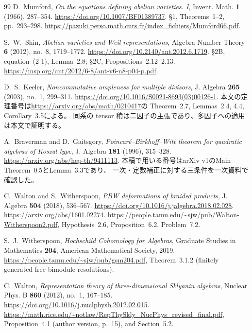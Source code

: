 \begin{thebibliography}{99}
D.~Mumford,
\emph{On the equations defining abelian varieties. I},
Invent. Math. \textbf{1} (1966), 287--354.
\url{https://doi.org/10.1007/BF01389737}.
\S1, Theorems~1--2, pp.~293--298.
\url{https://pazuki.perso.math.cnrs.fr/index_fichiers/Mumford66.pdf}.

S.~W.~Shin,
\emph{Abelian varieties and Weil representations},
Algebra Number Theory \textbf{6} (2012), no.~8, 1719--1772.
\url{https://doi.org/10.2140/ant.2012.6.1719}.
\S2B, equation~(2-1), Lemma~2.8; \S2C, Propositions~2.12--2.13.
\url{https://msp.org/ant/2012/6-8/ant-v6-n8-p04-p.pdf}.

D.~S.~Keeler,
\emph{Noncommutative ampleness for multiple divisors},
J. Algebra \textbf{265} (2003), no.~1, 299--311.
\url{https://doi.org/10.1016/S0021-8693(03)00126-1}.
本文の定理番号は\url{https://arxiv.org/abs/math/0210417}の
Theorem~2.7, Lemmas~2.4, 4.4, Corollary~3.5による。
同系の tensor 積は二因子の主張であり、多因子への適用は本文で証明する。

A.~Braverman and D.~Gaitsgory,
\emph{Poincar\'e--Birkhoff--Witt theorem for quadratic algebras of Koszul type},
J. Algebra \textbf{181} (1996), 315--328.
\url{https://arxiv.org/abs/hep-th/9411113}.
本稿で用いる番号はarXiv v1のMain Theorem~0.5とLemma~3.3であり、
一次・定数補正に対する三条件を一次資料で確認した。

C.~Walton and S.~Witherspoon,
\emph{PBW deformations of braided products},
J. Algebra \textbf{504} (2018), 536--567.
\url{https://doi.org/10.1016/j.jalgebra.2018.02.028}.
\url{https://arxiv.org/abs/1601.02274}.
\url{https://people.tamu.edu/~sjw/pub/Walton-Witherspoon2.pdf},
Hypothesis~2.6, Proposition~6.2, Problem~7.2.

S.~J.~Witherspoon,
\emph{Hochschild Cohomology for Algebras},
Graduate Studies in Mathematics \textbf{204}, American Mathematical Society, 2019.
\url{https://people.tamu.edu/~sjw/pub/gsm204.pdf},
Theorem~3.1.2 (finitely generated free bimodule resolutions).

C.~Walton,
\emph{Representation theory of three-dimensional Sklyanin algebras},
Nuclear Phys. B \textbf{860} (2012), no.~1, 167--185.
\url{https://doi.org/10.1016/j.nuclphysb.2012.02.015}.
\url{https://math.rice.edu/~notlaw/RepThySkly_NucPhys_revised_final.pdf},
Proposition~4.1 (author version, p.~15), and Section~5.2.


\end{thebibliography}
